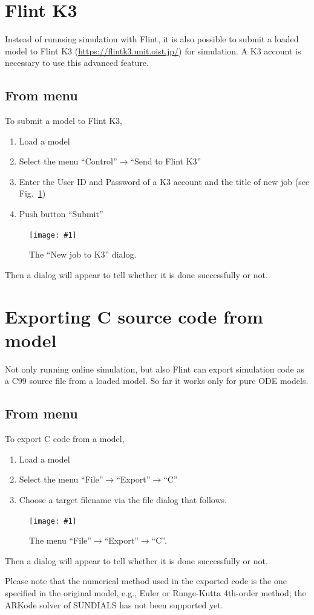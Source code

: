 \documentclass[a4paper,10pt]{report}
\newcommand\FigureOfImage[2]{\begin{figure}[h]
  \centering
  \texttt{[image: \#1]}
  \caption{#2}\label{fig:#1}
\end{figure}}
\begin{document}
\section{Flint K3}
Instead of runnsing simulation with Flint, it is also possible to submit a loaded
model to Flint K3 (\url{https://flintk3.unit.oist.jp/}) for simulation.
A K3 account is necessary to use this advanced feature.

\subsection{From menu}
To submit a model to Flint K3,
\begin{enumerate}
\item Load a model
\item Select the menu ``Control''$\rightarrow$``Send to Flint K3''
\item Enter the User ID and Password of a K3 account and the title of new job
  (see Fig.~\ref{fig:new-job-to-k3})
\item Push button ``Submit''
\end{enumerate}
\FigureOfImage{new-job-to-k3}{The ``New job to K3'' dialog.}
Then a dialog will appear to tell whether it is done successfully or not.

\section{Exporting C source code from model}
Not only running online simulation, but also Flint can export simulation code
as a C99 source file from a loaded model. So far it works only for pure ODE models.

\subsection{From menu}
To export C code from a model,
\begin{enumerate}
\item Load a model
\item Select the menu ``File''$\rightarrow$``Export''$\rightarrow$``C''
\item Choose a target filename via the file dialog that follows.
\end{enumerate}
\FigureOfImage{export-to-c}{The menu ``File''$\rightarrow$``Export''$\rightarrow$``C''.}
Then a dialog will appear to tell whether it is done successfully or not.

Please note that the numerical method used in the exported code is the one
specified in the original model, e.g., Euler or Runge-Kutta 4th-order method;
the ARKode solver of SUNDIALS has not been supported yet.
\end{document}
